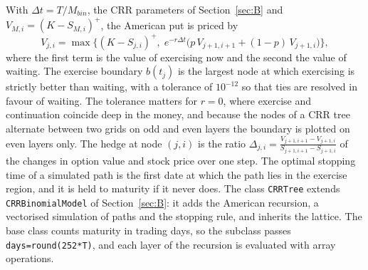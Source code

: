 With $\Delta t=T/M_{bin}$, the CRR parameters of Section~\ref{sec:B} and $V_{M,i}=(K-S_{M,i})^+$, the American put is priced by
\begin{equation}\label{eq:crr}
 V_{j,i}=\max\Big\{(K-S_{j,i})^+,\;e^{-r\Delta t}\big(p\,V_{j+1,i+1}+(1-p)\,V_{j+1,i}\big)\Big\},
\end{equation}
where the first term is the value of exercising now and the second the value of waiting.
The exercise boundary $b(t_j)$ is the largest node at which exercising is strictly better than waiting, with a tolerance of $10^{-12}$ so that ties are resolved in favour of waiting.
The tolerance matters for $r=0$, where exercise and continuation coincide deep in the money, and because the nodes of a CRR tree alternate between two grids on odd and even layers the boundary is plotted on even layers only.
The hedge at node $(j,i)$ is the ratio $\Delta_{j,i}=\frac{V_{j+1,i+1}-V_{j+1,i}}{S_{j+1,i+1}-S_{j+1,i}}$ of the changes in option value and stock price over one step.
The optimal stopping time of a simulated path is the first date at which the path lies in the exercise region, and it is held to maturity if it never does.
The class \texttt{CRRTree} extends \texttt{CRRBinomialModel} of Section~\ref{sec:B}: it adds the American recursion, a vectorised simulation of paths and the stopping rule, and inherits the lattice.
The base class counts maturity in trading days, so the subclass passes \texttt{days=round(252*T)}, and each layer of the recursion is evaluated with array operations.
